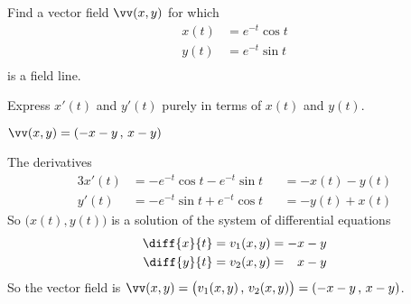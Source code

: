 \begin{question}
Find a vector field $\vv(x,y)$ for which
\begin{align*}
x(t) &= e^{-t}\cos t \\
y(t) &= e^{-t}\sin t \\
\end{align*}
is a field line.
\end{question}

\begin{hint} 
Express $x'(t)$ and $y'(t)$ purely in terms of $x(t)$ and $y(t)$.
\end{hint}

\begin{answer} 
$\vv(x,y) = (-x-y\,,\,x-y)$
\end{answer}

\begin{solution}
The derivatives
\begin{alignat*}{3}
x'(t) &= -e^{-t}\cos t - e^{-t}\sin t &&= -x(t)-y(t) \\
y'(t) &= -e^{-t}\sin t + e^{-t}\cos t &&= -y(t)+x(t) 
\end{alignat*}
So $\big(x(t),y(t)\big)$ is a solution of the system of differential equations
\begin{align*}
\diff{x}{t} &= v_1(x,y) = -x-y \\
\diff{y}{t} &= v_2(x,y) = \phantom{-}x-y
\end{align*}
So the vector field is $\vv(x,y) = \big(v_1(x,y)\,,\,v_2(x,y)\big) 
                                 = (-x-y\,,\,x-y)$.
\end{solution}




%
%
%



\subsection*{\Procedural}

